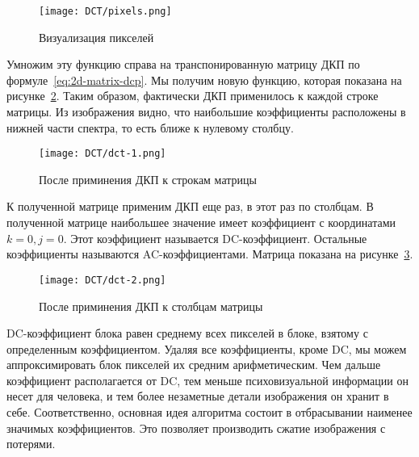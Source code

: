 \begin{figure}[ht!]
    \centering
    \caption{Визуализация пикселей}
    \texttt{[image: DCT/pixels.png]}
    \label{img:pixels-dct}
\end{figure}

Умножим эту функцию справа на транспонированную матрицу ДКП
по формуле~\ref{eq:2d-matrix-dcp}. Мы получим новую функцию,
которая показана на рисунке~\ref{img:dct-1}.
Таким образом, фактически ДКП применилось к каждой строке матрицы.
Из изображения видно, что наибольшие коэффициенты расположены
в нижней части спектра, то есть ближе к нулевому столбцу.

\begin{figure}[ht!]
    \centering
    \caption{После приминения ДКП к строкам матрицы}
    \texttt{[image: DCT/dct-1.png]}
    \label{img:dct-1}
\end{figure}

К полученной матрице применим ДКП еще раз, в этот раз по столбцам.
В полученной матрице наибольшее значение имеет коэффициент с координатами
$k = 0, j = 0$. Этот коэффициент называется DC-коэффициент.
Остальные коэффициенты называются AC-коэффициентами.
Матрица показана на рисунке~\ref{img:dct-2}.

\begin{figure}[ht!]
    \centering
    \caption{После приминения ДКП к столбцам матрицы}
    \texttt{[image: DCT/dct-2.png]}
    \label{img:dct-2}
\end{figure}

DC-коэффициент блока равен среднему всех пикселей в блоке,
взятому с определенным коэффициентом. Удаляя все коэффициенты,
кроме DC, мы можем аппроксимировать блок пикселей их средним
арифметическим. Чем дальше коэффициент располагается от DC,
тем меньше психовизуальной информации он несет для человека,
и тем более незаметные детали изображения он хранит в себе.
Соответственно, основная идея алгоритма состоит в отбрасывании
наименее значимых коэффициентов. Это позволяет производить сжатие
изображения с потерями.

